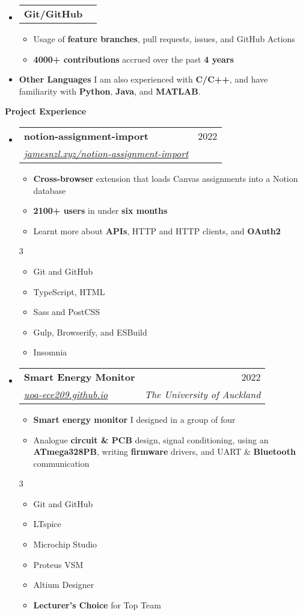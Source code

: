 \documentclass[11pt,a4paper]{article}[leftmargin=*]
\makeatletter
\def \entryspacing {-0pt}
\def \bulletstylei {\faAngleRight\hspace{-4.5pt}}
\def \bulletstyleii {\faCaretRight\hspace{-4.5pt}}
\renewcommand{\section}[2]{\vspace{5pt}
  \colorbox{secondary}{\color{white}\raggedbottom\normalsize\textbf{{#1}{\hspace{2pt}#2\hspace{4pt}}}}
}
\newcommand{\resumeEntryStart}{\begin{itemize}[leftmargin=2.5mm]}
\newcommand{\resumeEntryEnd}{\end{itemize}\vspace{\entryspacing}}
\newcommand{\resumeItemListStart}{\begin{itemize}[leftmargin=4.5mm]}
\newcommand{\resumeItemListEnd}{\end{itemize}}
\newcommand{\resumeItemListStartColumns}[2][-0.5]{\vspace*{#1\multicolsep}
\begin{multicols}{#2}\begin{itemize}[leftmargin=4.5mm]}
\newcommand{\resumeItemListEndColumns}[1][-1]{\end{itemize}\end{multicols}\vspace*{#1\multicolsep}}
\newcommand{\resumeItem}[2][\bulletstylei]{
  \item[\small#1]\small{
    {#2 \vspace{-2pt}}
  }
}
\newcommand{\resumeEntryTSDL}[4]{
  \vspace{-1pt}\item[]
    \begin{tabularx}{0.97\textwidth}{X@{\hspace{60pt}}r}
      \textbf{\color{primary}#1} & {\firabook\color{accent}\small#2} \\
      \textit{\color{accent}\small#3} & \textit{\color{accent}\small#4} \\
    \end{tabularx}\vspace{-6pt}
}
\newcommand{\resumeEntryTD}[2]{
  \vspace{-1pt}\item[]
    \begin{tabularx}{0.97\textwidth}{X@{\hspace{60pt}}r}
      \textbf{\color{primary}#1} & {\firabook\color{accent}\small#2} \\
    \end{tabularx}\vspace{-6pt}
}
\newcommand{\resumeEntryS}[2]{
  \item[]\small{
    \textbf{\color{primary}#1 }{ #2 \vspace{-4pt}}
  }
}
\newcommand{\resumeBf}[1]{\small\textbf{\color{halfbold}#1}}
\makeatother
\begin{document}
\resumeEntryStart
\resumeEntryTD
{Git/GitHub}{}
\resumeItemListStart
\resumeItem {Usage of \resumeBf{feature branches}, pull requests, issues, and GitHub Actions}
\resumeItem {\resumeBf{4000+ contributions} accrued over the past \resumeBf{4 years}}
\resumeItemListEnd
\resumeEntryEnd

\resumeEntryStart
\resumeEntryS
{Other Languages}{I am also experienced with \resumeBf{C/C++}, and have familiarity with \resumeBf{Python}, \resumeBf{Java}, and \resumeBf{MATLAB}.}
\resumeEntryEnd

\pagebreak


\section{\faFlask}{Project Experience}

\resumeEntryStart
\resumeEntryTSDL
{notion-assignment-import}{2022}
{\href{https://jamesnzl.xyz/notion-assignment-import}{jamesnzl.xyz/notion-assignment-import}}{}
\resumeItemListStart
\resumeItem {\resumeBf{Cross-browser} extension that loads Canvas assignments into a Notion database}
\resumeItem {\resumeBf{2100+ users} in under \resumeBf{six months}}
\resumeItem {Learnt more about \resumeBf{APIs}, HTTP and HTTP clients, and \resumeBf{OAuth2}}
\resumeItemListEnd
\resumeItemListStartColumns{3}
\resumeItem[\bulletstyleii] {Git and GitHub}
\resumeItem[\bulletstyleii] {TypeScript, HTML}
\resumeItem[\bulletstyleii] {Sass and PostCSS}
\resumeItem[\bulletstyleii] {Gulp, Browserify, and ESBuild}
\resumeItem[\bulletstyleii] {Insomnia}
\resumeItemListEndColumns
\resumeEntryEnd

\resumeEntryStart
\resumeEntryTSDL
{Smart Energy Monitor}{2022}
{\href{https://uoa-ece209.github.io}{uoa-ece209.github.io}}{The University of Auckland}
\resumeItemListStart
\resumeItem {\resumeBf{Smart energy monitor} I designed in a group of four}
\resumeItem {Analogue \resumeBf{circuit \& PCB} design, signal conditioning, using an \resumeBf{ATmega328PB}, writing \resumeBf{firmware} drivers, and UART \& \resumeBf{Bluetooth} communication}
\resumeItemListEnd
\resumeItemListStartColumns{3}
\resumeItem[\bulletstyleii] {Git and GitHub}
\resumeItem[\bulletstyleii] {LTspice}
\resumeItem[\bulletstyleii] {Microchip Studio}
\resumeItem[\bulletstyleii] {Proteus VSM}
\resumeItem[\bulletstyleii] {Altium Designer}
\resumeItem[\bulletstyleii] {\resumeBf{Lecturer's Choice} for Top Team}
\resumeItemListEndColumns
\resumeEntryEnd
\end{document}
